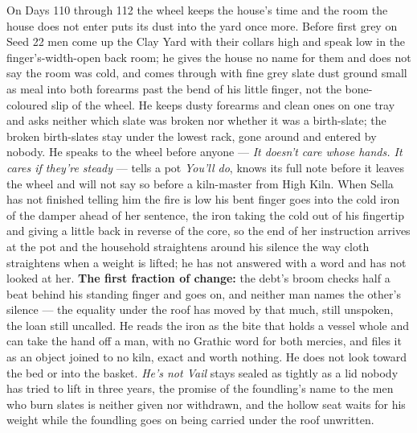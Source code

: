 \documentclass{design/chronicle}
\begin{document}
{On Days 110 through 112 the wheel keeps the house’s time and the room the house does not enter puts its dust into the yard once more. Before first grey on Seed 22 men come up the Clay Yard with their collars high and speak low in the finger’s-width-open back room; he gives the house no name for them and does not say the room was cold, and comes through with fine grey slate dust ground small as meal into both forearms past the bend of his little finger, not the bone-coloured slip of the wheel. He keeps dusty forearms and clean ones on one tray and asks neither which slate was broken nor whether it was a birth-slate; the broken birth-slates stay under the lowest rack, gone around and entered by nobody. He speaks to the wheel before anyone — \emph{It doesn’t care whose hands. It cares if they’re steady} — tells a pot \emph{You’ll do}, knows its full note before it leaves the wheel and will not say so before a kiln-master from High Kiln. When Sella has not finished telling him the fire is low his bent finger goes into the cold iron of the damper ahead of her sentence, the iron taking the cold out of his fingertip and giving a little back in reverse of the core, so the end of her instruction arrives at the pot and the household straightens around his silence the way cloth straightens when a weight is lifted; he has not answered with a word and has not looked at her. \textbf{The first fraction of change:} the debt’s broom checks half a beat behind his standing finger and goes on, and neither man names the other’s silence — the equality under the roof has moved by that much, still unspoken, the loan still uncalled. He reads the iron as the bite that holds a vessel whole and can take the hand off a man, with no Grathic word for both mercies, and files it as an object joined to no kiln, exact and worth nothing. He does not look toward the bed or into the basket. \emph{He’s not Vail} stays sealed as tightly as a lid nobody has tried to lift in three years, the promise of the foundling’s name to the men who burn slates is neither given nor withdrawn, and the hollow seat waits for his weight while the foundling goes on being carried under the roof unwritten.

}
\end{document}
